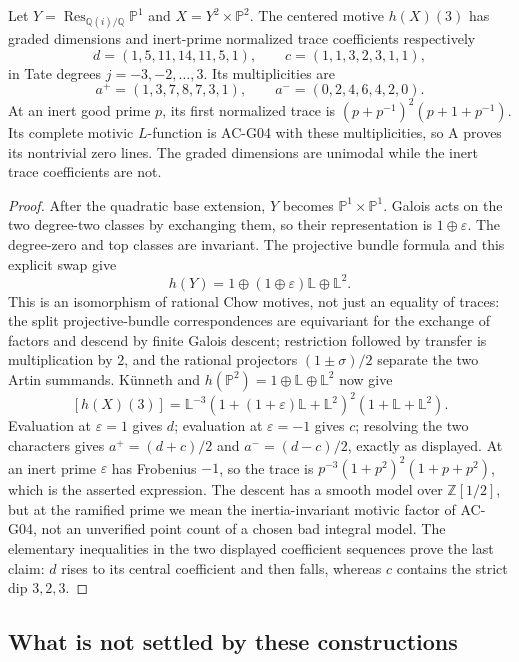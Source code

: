 \begin{proposition}
\label{AC-G12}
Let $Y=\operatorname{Res}_{\mathbb Q(i)/\mathbb Q}\mathbb P^1$ and
$X=Y^2\times\mathbb P^2$.  The centered motive $h(X)(3)$ has graded
dimensions and inert-prime normalized trace coefficients respectively
\[
 d=(1,5,11,14,11,5,1),\qquad c=(1,1,3,2,3,1,1),
\]
in Tate degrees $j=-3,-2,\ldots,3$.  Its multiplicities are
\[
 a^+=(1,3,7,8,7,3,1),\qquad a^-=(0,2,4,6,4,2,0).
\]
At an inert good prime $p$, its first normalized trace is
$(p+p^{-1})^2(p+1+p^{-1})$.
Its complete motivic $L$-function is AC-G04 with these multiplicities,
so A proves its nontrivial zero lines.  The graded dimensions are unimodal
while the inert trace coefficients are not.
\end{proposition}
\begin{proof}
After the quadratic base extension, $Y$ becomes $\mathbb P^1\times\mathbb P^1$.
Galois acts on the two degree-two classes by exchanging them, so their
representation is $1\oplus\varepsilon$.  The degree-zero and top classes
are invariant.  The projective bundle formula and this explicit swap give
\[
 h(Y)=1\oplus(1\oplus\varepsilon)\mathbb L\oplus\mathbb L^2.
\]
This is an isomorphism of rational Chow motives, not just an equality
of traces: the split projective-bundle correspondences are equivariant
for the exchange of factors and descend by finite Galois descent;
restriction followed by transfer is multiplication by $2$, and the
rational projectors $(1\pm\sigma)/2$ separate the two Artin summands.
K\"unneth and $h(\mathbb P^2)=1\oplus\mathbb L\oplus\mathbb L^2$ now give
\[
 [h(X)(3)]=\mathbb L^{-3}
 (1+(1+\varepsilon)\mathbb L+\mathbb L^2)^2
 (1+\mathbb L+\mathbb L^2).
\]
Evaluation at $\varepsilon=1$ gives $d$; evaluation at
$\varepsilon=-1$ gives $c$; resolving the two characters gives
$a^+=(d+c)/2$ and $a^-=(d-c)/2$, exactly as displayed.
At an inert prime $\varepsilon$ has Frobenius $-1$, so the trace is
$p^{-3}(1+p^2)^2(1+p+p^2)$, which is the asserted expression.
The descent has a smooth model over $\mathbb Z[1/2]$, but at the ramified
prime we mean the inertia-invariant motivic factor of AC-G04, not an
unverified point count of a chosen bad integral model.  The elementary
inequalities in the two displayed coefficient sequences prove the last
claim: $d$ rises to its central coefficient and then falls, whereas
$c$ contains the strict dip $3,2,3$.
\end{proof}

\subsection{What is not settled by these constructions}

